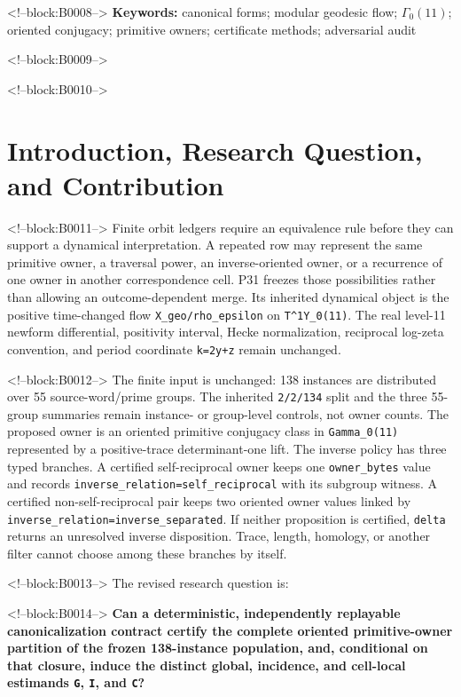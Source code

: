 \documentclass[11pt]{article}
\begin{document}
<!--block:B0008-->
\noindent\textbf{Keywords:} canonical forms; modular geodesic flow;
$\Gamma_0(11)$; oriented conjugacy; primitive owners; certificate methods;
adversarial audit

<!--block:B0009-->
\medskip
{}

<!--block:B0010-->
\hypertarget{1-introduction-research-question-and-contribution}{%
\section{Introduction, Research Question, and
Contribution}\label{1-introduction-research-question-and-contribution}}

<!--block:B0011-->
Finite orbit ledgers require an equivalence rule before they can support
a dynamical interpretation. A repeated row may represent the same
primitive owner, a traversal power, an inverse-oriented owner, or a
recurrence of one owner in another correspondence cell. P31 freezes
those possibilities rather than allowing an outcome-dependent merge. Its
inherited dynamical object is the positive time-changed flow
\texttt{X\_geo/rho\_epsilon} on \texttt{T\^{}1Y\_0(11)}. The real
level-11 newform differential, positivity interval, Hecke normalization,
reciprocal log-zeta convention, and period coordinate \texttt{k=2y+z}
remain unchanged.

<!--block:B0012-->
The finite input is unchanged: 138 instances are distributed over 55
source-word/prime groups.  The inherited \texttt{2/2/134} split and the three
55-group summaries remain instance- or group-level controls, not owner counts.
The proposed owner is an oriented primitive conjugacy class in
\texttt{Gamma\_0(11)} represented by a positive-trace determinant-one lift.  The
inverse policy has three typed branches.  A certified self-reciprocal owner keeps
one \texttt{owner\_bytes} value and records
\texttt{inverse\_relation=self\_reciprocal} with its subgroup witness.  A
certified non-self-reciprocal pair keeps two oriented owner values linked by
\texttt{inverse\_relation=inverse\_separated}.  If neither proposition is
certified, \texttt{delta} returns an unresolved inverse disposition.  Trace,
length, homology, or another filter cannot choose among these branches by itself.

<!--block:B0013-->
The revised research question is:

<!--block:B0014-->
\textbf{Can a deterministic, independently replayable canonicalization
contract certify the complete oriented primitive-owner partition of the
frozen 138-instance population, and, conditional on that closure, induce
the distinct global, incidence, and cell-local estimands \texttt{G},
\texttt{I}, and \texttt{C}?}
\end{document}
